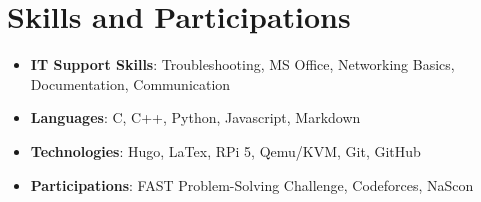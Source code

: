 \documentclass[letterpaper,11pt]{article}
\begin{document}
	
	
	\section{Skills and Participations}
	\begin{itemize}[leftmargin=*]
		\item \textbf{IT Support Skills}{: Troubleshooting, MS Office, Networking Basics, Documentation, Communication}
		\item \textbf{Languages}{: C, C++, Python, Javascript, Markdown}
		\item \textbf{Technologies}{: Hugo, LaTex, RPi 5, Qemu/KVM, Git, GitHub}
		\item \textbf{Participations}{: FAST Problem-Solving Challenge, Codeforces, NaScon}
	\end{itemize}
\end{document}
